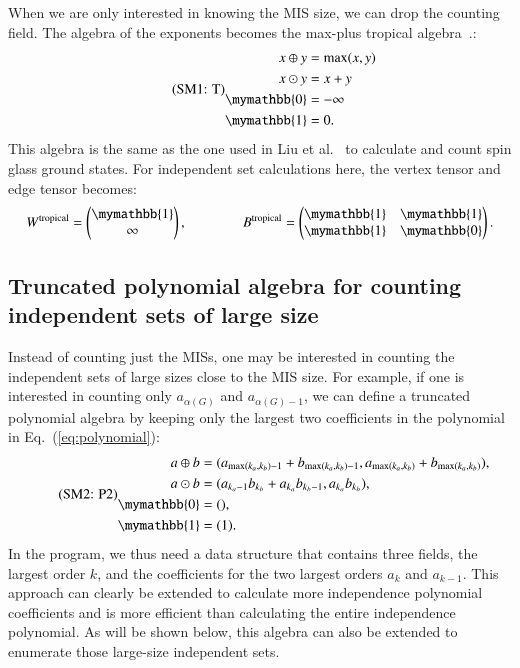 \documentclass[onefignum, onetabnum]{siamart190516}
\newcommand{\eqname}[1]{\stepcounter{equation}\tag{\theequation : #1}}
\newcommand{\<}{\langle}
\renewcommand{\>}{\rangle}
\newcommand{\Eq}[1]{Eq.~(\ref{#1})}
\newcounter{example}
\begin{document}
When we are only interested in knowing the MIS size, we can drop the counting field.
The algebra of the exponents becomes the max-plus tropical algebra~\cite{Maclagan2015, Moore2011}.:
\begin{equation}\eqname{T}
    \begin{split}
        x \oplus y &= \max(x,y)\\
        x \odot y &= x + y\\
        \mymathbb{0} &= -\infty\\
        \mymathbb{1} &= 0.
    \end{split}\label{eq:tropical}
\end{equation}
This algebra is the same as the one used in Liu et al.~\cite{Liu2021} to calculate and count spin glass ground states.
For independent set calculations here, the vertex tensor and edge tensor becomes:
\begin{equation}
    W^{\rm tropical} = \left(\begin{matrix}
        \mymathbb{1} \\
        \infty
    \end{matrix}\right),   
    \qquad \qquad
        B^{\rm tropical} = \left(\begin{matrix}
        \mymathbb{1}  & \mymathbb{1} \\
        \mymathbb{1} & \mymathbb{0}
    \end{matrix}\right).
\end{equation}

\subsection{Truncated polynomial algebra for counting independent sets of large size}
Instead of counting just the MISs, one may be interested in counting the independent sets of large sizes close to the MIS size.
For example, if one is interested in counting only $a_{\alpha(G)}$ and $a_{\alpha(G)-1}$, we can define a truncated polynomial algebra by keeping only the largest two coefficients in the polynomial in \Eq{eq:polynomial}:
\begin{equation}
    \eqname{P2}
    \begin{split}
    a \oplus b &= (a_{\max(k_a, k_b)-1} + b_{\max(k_a, k_b)-1}, a_{\max(k_a, k_b)} + b_{\max(k_a, k_b)}),\\
    a \odot b &= (a_{k_a-1} b_{k_b}+a_{k_a} b_{k_b-1}, a_{k_a} b_{k_b}),\\
    \mymathbb{0} &= (), \\
    \mymathbb{1} &= (1).\label{eq:max2poly}
    \end{split}
\end{equation}
In the program, we thus need a data structure that contains three fields, the largest order $k$, and the coefficients for the two largest orders $a_k$ and $a_{k-1}$.
This approach can clearly be extended to calculate more independence polynomial coefficients and is more efficient than calculating the entire independence polynomial.
As will be shown below, this algebra can also be extended to enumerate those large-size independent sets.
\end{document}
